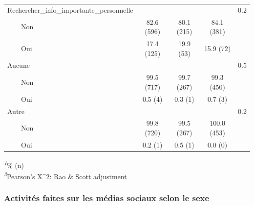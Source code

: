 \documentclass[
]{article}
\begin{document}
\begin{table}[!t]
\begin{tabular*}{\linewidth}{@{\extracolsep{\fill}}lcccc}
Rechercher\_info\_importante\_personnelle &  &  &  & 0.2 \\ 
    Non & 82.6 (596) & 80.1 (215) & 84.1 (381) &  \\ 
    Oui & 17.4 (125) & 19.9 (53) & 15.9 (72) &  \\ 
Aucune &  &  &  & 0.5 \\ 
    Non & 99.5 (717) & 99.7 (267) & 99.3 (450) &  \\ 
    Oui & 0.5 (4) & 0.3 (1) & 0.7 (3) &  \\ 
Autre &  &  &  & 0.2 \\ 
    Non & 99.8 (720) & 99.5 (267) & 100.0 (453) &  \\ 
    Oui & 0.2 (1) & 0.5 (1) & 0.0 (0) &  \\ 
\bottomrule
\end{tabular*}
\begin{minipage}{\linewidth}
\textsuperscript{\textit{1}}\% (n)\\
\textsuperscript{\textit{2}}Pearson's X\^{}2: Rao \& Scott adjustment\\
\end{minipage}
\end{table}

\vspace{1cm}

\hypertarget{activituxe9s-faites-sur-les-muxe9dias-sociaux-selon-le-sexe}{%
\subsubsection{Activités faites sur les médias sociaux selon le
sexe}\label{activituxe9s-faites-sur-les-muxe9dias-sociaux-selon-le-sexe}}
\end{document}
